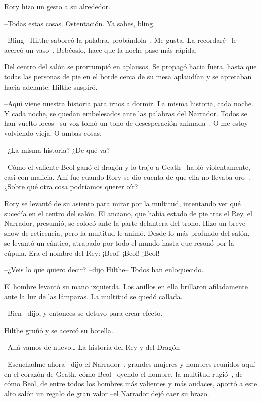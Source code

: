 {Rory hizo un gesto a su alrededor.}

{--Todas estas cosas. Ostentación. Ya sabes, bling.}

{--Bling --Hilthe saboreó la palabra, probándola--. Me gusta. La
	recordaré --le acercó un vaso--. Bebéoslo, hace que la noche pase más
rápida.}

{Del centro del salón se prorrumpió en aplausos. Se propagó hacia fuera,
	hasta que todas las personas de pie en el borde cerca de su mesa
aplaudían y se apretaban hacia adelante. Hilthe suspiró.}

{--Aquí viene nuestra historia para irnos a dormir. La misma historia,
	cada noche. Y cada noche, se quedan embelesados ante las palabras del
	Narrador. Todos se han vuelto locos --su voz tomó un tono de
desesperación animada--. O me estoy volviendo vieja. O ambas cosas.}

{--¿La misma historia? ¿De qué va?}

{--Cómo el valiente Beol ganó el dragón y lo trajo a Geath --habló
	violentamente, casi con malicia. Ahí fue cuando Rory se dio cuenta de
que ella no llevaba oro--. ¿Sobre qué otra cosa podríamos querer oír?}

{Rory se levantó de su asiento para mirar por la multitud, intentando
	ver qué sucedía en el centro del salón. El anciano, que había estado de
	pie tras el Rey, el Narrador, presumió, se colocó ante la parte
	delantera del trono. Hizo un breve show de reticencia, pero la multitud
	le animó. Desde lo más profundo del salón, se levantó un cántico,
	atrapado por todo el mundo hasta que resonó por la cúpula. Era el nombre
del Rey: ¡Beol! ¡Beol! ¡Beol!}

{--¿Veis lo que quiero decir? --dijo Hilthe-- Todos han enloquecido.}

{El hombre levantó su mano izquierda. Los anillos en ella brillaron
afiladamente ante la luz de las lámparas. La multitud se quedó callada.}

{--Bien --dijo, y entonces se detuvo para crear efecto.}

{Hilthe gruñó y se acercó su botella.}

{--Allá vamos de nuevo\ldots{} La historia del Rey y del Dragón}

{--Escuchadme ahora --dijo el Narrador--, grandes mujeres y hombres
	reunidos aquí en el corazón de Geath, cómo Beol --oyendo el nombre, la
	multitud rugió--, de cómo Beol, de entre todos los hombres más valientes
	y más audaces, aportó a este alto salón un regalo de gran valor --el
Narrador dejó caer su brazo.}

